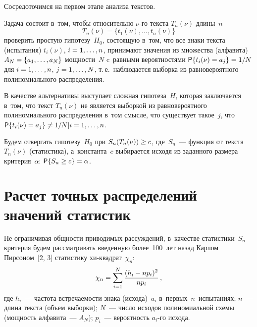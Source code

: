 \begin{multicols}{2}
    Сосредоточимся на первом этапе анализа текстов. 
    
    Задача состоит в~том, чтобы относительно $\nu$-го текста $T_n(\nu)$ 
длины~$n$
    $$
T_n(\nu) = \{t_1(\nu), \ldots, t_n(\nu)\}
$$
проверить простую гипотезу~$H_0$, состоящую в~том, что все знаки 
текста (испытания) $t_i(\nu)$, $i \hm= 1, \ldots, n$, принимают значения из 
множества (алфавита) $A_N \hm=\{a_1, \ldots, a_N\}$ мощности~$N$ 
c~равными вероятностями ${\sf P}\{t_i(\nu) \hm= a_j\} \hm= 1/N$ для $i \hm= 1, 
\ldots, n$, $j \hm= 1, \ldots, N$, т.\,е.\ наблюдается выборка из 
равновероятного полиномиального распределения.
    
    В качестве альтернативы выступает сложная гипотеза~$H$, которая 
заключается в~том, что текст $T_n(\nu)$ не является выборкой из 
равновероятного полиномиального распределения в~том смысле, что 
существует такое~$j$, что ${\sf P}\{t_i(\nu) \hm= a_j\} \not= 1/N \vert  i \hm= 1, \ldots, 
n$.
    
    Будем отвергать гипотезу~$H_0$ при $S_n(T_n(\nu)) \hm\geq c$, 
где~$S_n$~--- функция от текста~$T_n(\nu)$ (статистика), а~константа~$c$ 
выбирается исходя из заданного размера критерия~$\alpha$: ${\sf P}\{S_n 
\hm\geq c\} \hm= \alpha$.
    
\section{Расчет точных распределений значений статистик}

    Не ограничивая общности приводимых рас\-суж\-де\-ний, в~качестве 
статистики~$S_n$ критерия будем рассматривать введенную 
более~100~лет назад Карлом Пирсоном~[2, 3] статистику хи-квад\-рат~$\chi_n$:
    $$
    \chi_n=\sum\limits_{i=1}^N \displaystyle\frac{\displaystyle (h_i-np_i)^2\mathstrut}{\displaystyle np_i\mathstrut}\,,
    $$
где $h_i$~--- частота встречаемости знака (исхода)~$a_i$ 
в~первых~$n$~испытаниях; $n$~--- длина текста (объем выборки); $N$~--- 
число исходов полиномиальной схемы (мощность алфавита~--- $A_N$); 
$p_i$~--- вероятность $a_i$-го исхода.


\end{multicols}

